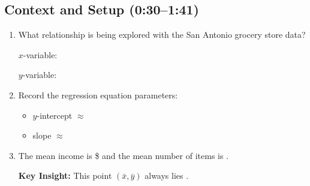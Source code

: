 \documentclass[11pt]{article}
\begin{document}
\subsection*{Context and Setup (0:30--1:41)}
\begin{enumerate}[resume, label=\arabic*.]
\item What relationship is being explored with the San Antonio grocery store data?

\vspace{0.5em}
$x$-variable: \underline{\hspace{3in}}

$y$-variable: \underline{\hspace{3in}}

\item Record the regression equation parameters:
\begin{itemize}
\item $y$-intercept $\approx$ \underline{\hspace{0.5in}}
\item slope $\approx$ \underline{\hspace{0.5in}}
\end{itemize}

\item The mean income is \$\underline{\hspace{1in}} and the mean number of items is \underline{\hspace{0.5in}}.

\textbf{Key Insight:} This point $(\bar{x}, \bar{y})$ always lies \underline{\hspace{2in}}.
\end{enumerate}
\end{document}
